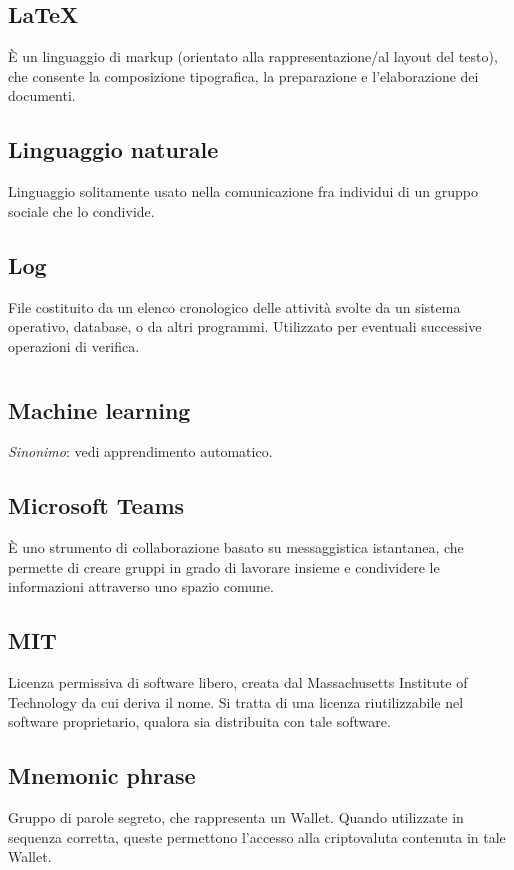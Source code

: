 	\subsection*{\LaTeX{}}
	È un linguaggio di markup (orientato alla rappresentazione/al layout del testo), che consente la composizione tipografica, la preparazione e l'elaborazione dei documenti.
	\subsection*{Linguaggio naturale}
	Linguaggio solitamente usato nella comunicazione fra individui di un gruppo sociale che lo condivide.
	\subsection*{Log}
	File costituito da un elenco cronologico delle attività svolte da un sistema operativo, database, o da altri programmi. Utilizzato per eventuali successive operazioni di verifica.
\pagebreak
\section[M]{}
	\subsection*{Machine learning}
	\emph{Sinonimo}: vedi apprendimento automatico.
	\subsection*{Microsoft Teams}
	È uno strumento di collaborazione basato su messaggistica istantanea, che permette di creare gruppi in grado di lavorare insieme e condividere le informazioni attraverso uno spazio comune.
	\subsection*{MIT}
	Licenza permissiva di software libero, creata dal Massachusetts Institute of Technology da cui deriva il nome. Si tratta di una licenza riutilizzabile nel software proprietario, qualora sia distribuita con tale software.
	\subsection*{Mnemonic phrase}
	Gruppo di parole segreto, che rappresenta un Wallet. Quando utilizzate in sequenza corretta, queste permettono l’accesso alla criptovaluta contenuta in tale Wallet.
